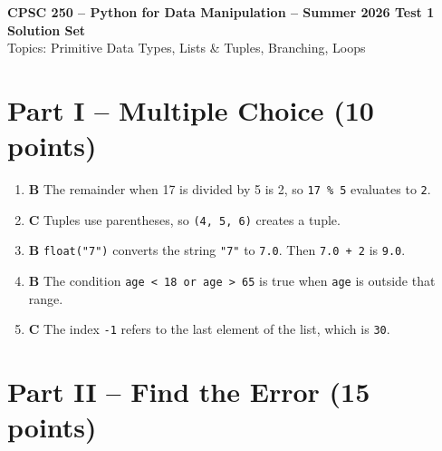 \documentclass[12pt]{article}
\begin{document}
\begin{center}
    \Large \textbf{CPSC 250 -- Python for Data Manipulation -- Summer 2026 Test 1} \\
    \large \textbf{Solution Set} \\
    \normalsize Topics: Primitive Data Types, Lists \& Tuples, Branching, Loops
\end{center}

\vspace{0.5cm}

\section*{Part I -- Multiple Choice (10 points)}

\begin{enumerate}[label=\arabic*.]
    \item \textbf{B} \quad The remainder when 17 is divided by 5 is 2, so \texttt{17 \% 5} evaluates to \texttt{2}.

    \item \textbf{C} \quad Tuples use parentheses, so \texttt{(4, 5, 6)} creates a tuple.

    \item \textbf{B} \quad \texttt{float("7")} converts the string \texttt{"7"} to \texttt{7.0}. Then \texttt{7.0 + 2} is \texttt{9.0}.

    \item \textbf{B} \quad The condition \texttt{age < 18 or age > 65} is true when \texttt{age} is outside that range.

    \item \textbf{C} \quad The index \texttt{-1} refers to the last element of the list, which is \texttt{30}.
\end{enumerate}

\section*{Part II -- Find the Error (15 points)}
\end{document}
